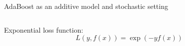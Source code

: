 \begin{frame}{AdaBoost as an additive model and stochastic setting}
\begin{columns}[T]
\begin{column}{0.48\textwidth}


\vspace{0.8em}
Exponential loss function:\vspace{-1ex}
\[L(y,f(x))=\exp(-yf(x))\]
\end{column}
\end{columns}

\end{frame}


